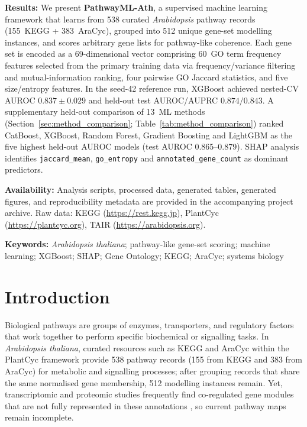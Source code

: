 \documentclass[12pt,letterpaper,oneside,openany]{book}
\begin{document}
\noindent\textbf{Results:}
We present \textbf{PathwayML-Ath}, a supervised machine learning framework that
learns from 538 curated \textit{Arabidopsis} pathway records
(155~KEGG + 383~AraCyc), grouped into 512 unique gene-set modelling instances,
and scores arbitrary gene lists for pathway-like coherence.
Each gene set is encoded as a 69-dimensional vector comprising 60~GO term frequency
features selected from the primary training data via frequency/variance filtering and mutual-information ranking,
four pairwise GO Jaccard statistics, and five size/entropy features. In the
seed-42 reference run, XGBoost achieved nested-CV AUROC $0.837 \pm 0.029$
and held-out test AUROC/AUPRC $0.874/0.843$. A supplementary held-out comparison of
13~ML methods (Section~\ref{sec:method_comparison}; Table~\ref{tab:method_comparison}) ranked
CatBoost, XGBoost, Random Forest, Gradient Boosting and LightGBM as the five highest held-out AUROC models
(test AUROC 0.865--0.879). SHAP analysis identifies
\texttt{jaccard\_mean}, \texttt{go\_entropy} and \texttt{annotated\_gene\_count} as dominant predictors.

\noindent\textbf{Availability:}
Analysis scripts, processed data, generated tables, generated figures, and reproducibility metadata are provided in the accompanying project archive.
Raw data: KEGG (\url{https://rest.kegg.jp}), PlantCyc (\url{https://plantcyc.org}),
TAIR (\url{https://arabidopsis.org}).

\noindent\textbf{Keywords:}
\textit{Arabidopsis thaliana}; pathway-like gene-set scoring; machine learning; XGBoost;
SHAP; Gene Ontology; KEGG; AraCyc; systems biology

\tableofcontents
\listoffigures
\listoftables

\mainmatter

\chapter{Introduction}
\label{sec:intro}

Biological pathways are groups of enzymes, transporters, and regulatory factors that work together to perform specific biochemical or signalling tasks. In \textit{Arabidopsis thaliana}, curated resources such as KEGG \citep{kanehisa2023kegg} and AraCyc within the PlantCyc framework \citep{hawkins2021plant} provide 538 pathway records (155 from KEGG and 383 from AraCyc) for metabolic and signalling processes; after grouping records that share the same normalised gene membership, 512 modelling instances remain. Yet, transcriptomic and proteomic studies frequently find co-regulated gene modules that are not fully represented in these annotations \citep{obayashi2018atted,usadel2009coexpression}, so current pathway maps remain incomplete.
\end{document}
